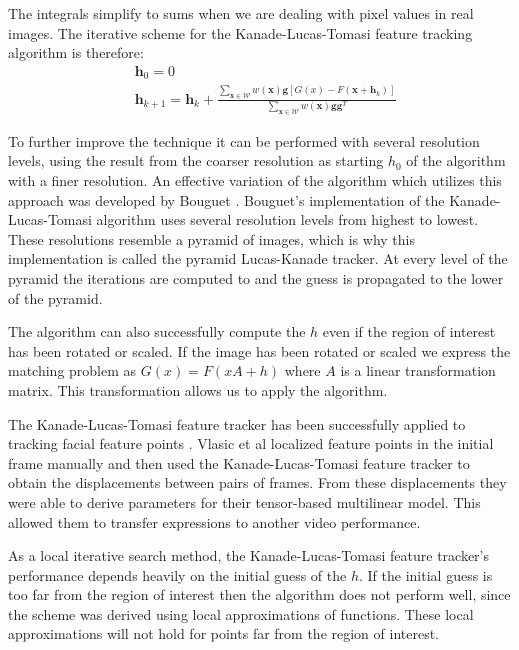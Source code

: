 \documentclass[11pt,a4paper]{report}
\begin{document}
The integrals simplify to sums when we are dealing with pixel values in real images.
The iterative scheme for the Kanade-Lucas-Tomasi feature tracking algorithm is therefore:
\begin{align}
& \mathbf{h}_0 = 0\\
& \mathbf{h}_{k+1} = \mathbf{h}_k + \frac{\sum_{ \mathbf{x} \in \mathcal{W}} w(\mathbf{x}) \mathbf{g}[G(x) - F(\mathbf{x} + \mathbf{h}_k)]}{\sum_{ \mathbf{x} \in \mathcal{W}} w(\mathbf{x}) \mathbf{g}\mathbf{g}^T}
\end{align}

To further improve the technique it can be performed with several resolution levels, using the result from the coarser resolution as starting
$h_0$ of the algorithm with a finer resolution. An effective variation of the
algorithm which utilizes this approach was developed by Bouguet
\cite{kanade4}. Bouguet's implementation of the Kanade-Lucas-Tomasi algorithm
uses several resolution levels from highest to lowest. These resolutions
resemble a pyramid of images, which is why this implementation is called the
pyramid Lucas-Kanade tracker. At every level of the pyramid the iterations are
computed to and the guess is propagated to the lower of the pyramid.

The algorithm can also successfully compute the $h$ even if the region of interest has been rotated or
scaled. If the image has been rotated or scaled we express the matching problem
as $G(x) = F(xA +h)$ where $A$ is a linear transformation matrix. This
transformation allows us
to apply the algorithm.

The Kanade-Lucas-Tomasi feature tracker has been successfully applied to
tracking facial feature points \cite{faceTransfer05}. Vlasic et al localized
feature points in the initial frame manually and then used the
Kanade-Lucas-Tomasi feature tracker to obtain the displacements between pairs of
frames. From these displacements they were able to derive parameters for their
tensor-based multilinear model. This allowed them to transfer expressions to
another video performance.

As a local iterative search method, the Kanade-Lucas-Tomasi feature tracker's
performance depends heavily on the initial guess of the $h$. If the initial
guess is too far from the region of interest then the algorithm does not perform
well, since the scheme was derived using local approximations of
functions. These local approximations will not hold for points far from the
region of interest.
\end{document}
